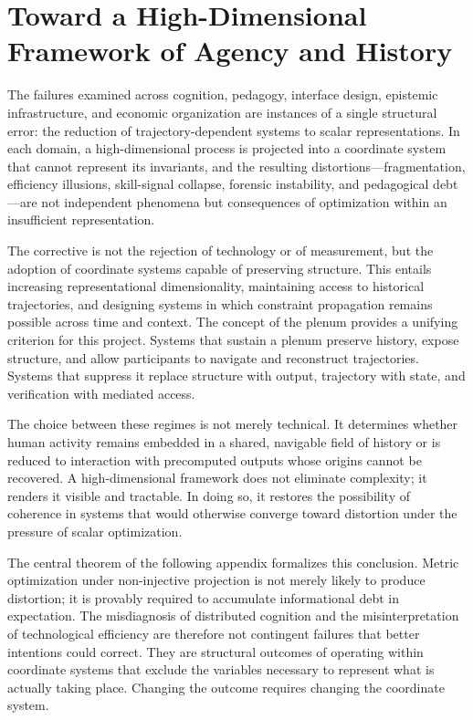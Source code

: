 \documentclass[12pt, a4paper]{article}
\begin{document}
\section{Toward a High-Dimensional Framework of Agency and History}

The failures examined across cognition, pedagogy, interface design, epistemic infrastructure, and economic organization are instances of a single structural error: the reduction of trajectory-dependent systems to scalar representations. In each domain, a high-dimensional process is projected into a coordinate system that cannot represent its invariants, and the resulting distortions---fragmentation, efficiency illusions, skill-signal collapse, forensic instability, and pedagogical debt---are not independent phenomena but consequences of optimization within an insufficient representation.

The corrective is not the rejection of technology or of measurement, but the adoption of coordinate systems capable of preserving structure. This entails increasing representational dimensionality, maintaining access to historical trajectories, and designing systems in which constraint propagation remains possible across time and context. The concept of the plenum provides a unifying criterion for this project. Systems that sustain a plenum preserve history, expose structure, and allow participants to navigate and reconstruct trajectories. Systems that suppress it replace structure with output, trajectory with state, and verification with mediated access.

The choice between these regimes is not merely technical. It determines whether human activity remains embedded in a shared, navigable field of history or is reduced to interaction with precomputed outputs whose origins cannot be recovered. A high-dimensional framework does not eliminate complexity; it renders it visible and tractable. In doing so, it restores the possibility of coherence in systems that would otherwise converge toward distortion under the pressure of scalar optimization.

The central theorem of the following appendix formalizes this conclusion. Metric optimization under non-injective projection is not merely likely to produce distortion; it is provably required to accumulate informational debt in expectation. The misdiagnosis of distributed cognition and the misinterpretation of technological efficiency are therefore not contingent failures that better intentions could correct. They are structural outcomes of operating within coordinate systems that exclude the variables necessary to represent what is actually taking place. Changing the outcome requires changing the coordinate system.
\end{document}

